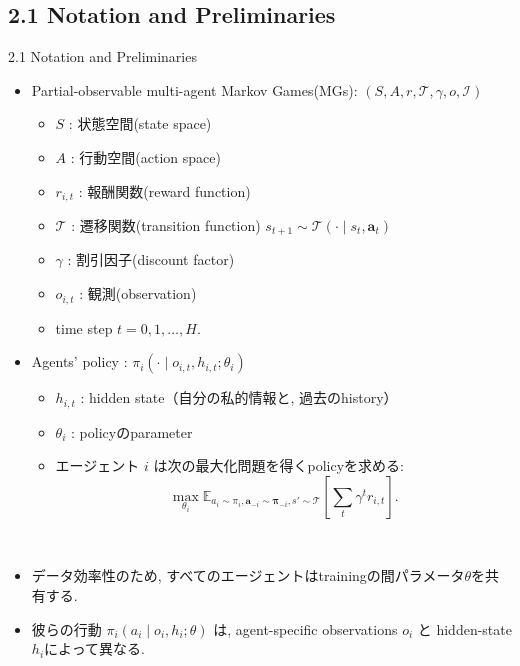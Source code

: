 \documentclass[unicode,aspectratio=169,11pt]{beamer}
\begin{document}
\subsection{2.1 Notation and Preliminaries}
\begin{frame}{2.1 Notation and Preliminaries}
    \begin{itemize}
        \item Partial-observable multi-agent Markov Games(MGs): $(S, A, r, \mathscr{T}, \gamma, o, \mathscr{I})$
        \begin{itemize}
            \item $S$ : 状態空間(state space)
            \item $A$ : 行動空間(action space)
            \item $r_{i,t}$ : 報酬関数(reward function)
            \item $\mathscr{T}$ : 遷移関数(transition function)  $s_{t+1} \sim \mathscr{T}(\cdot \mid s_t, \bm{a}_t)$
            \item $\gamma$ : 割引因子(discount factor)
            \item $o_{i,t}$ : 観測(observation)
            \item time step $t = 0, 1, \dots, H$.
        \end{itemize}
    \end{itemize}
\end{frame}

\begin{frame}{}{}
\begin{itemize}
    \item Agents' policy : $\pi_i(\cdot \mid o_{i,t}, h_{i,t}; \theta_i)$
    \begin{itemize}
        \item $h_{i,t}$ : hidden state（自分の私的情報と, 過去のhistory）
        \item $\theta_i$ : policyのparameter
        \item エージェント $i$ は次の最大化問題を得くpolicyを求める:
        \[
            \max_{\theta_i} \mathbb{E}_{a_i \sim \pi_i, \bm{a}_{-i} \sim \bm{\pi}_{-i}, s'\sim \mathscr{T}}\left[\sum_{t}\gamma^t r_{i,t}\right].
            \tag{1}
        \]
    \end{itemize}
    　
    \item データ効率性のため, すべてのエージェントはtrainingの間パラメータ$\theta$を共有する.
    \item 彼らの行動 $\pi_i(a_i\mid o_i, h_i; \theta)$ は, agent-specific observations $o_i$ と hidden-state $h_i$によって異なる.
\end{itemize}
\end{frame}
\end{document}
